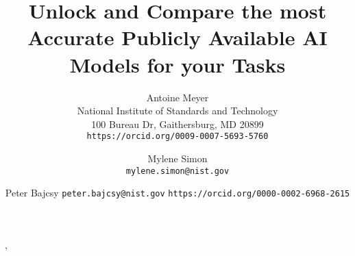 \documentclass[10pt,twocolumn,letterpaper]{article}
\title{Unlock and Compare the most Accurate Publicly Available AI Models for your Tasks}
\author{Antoine Meyer\\
National Institute of Standards and Technology\\
100 Bureau Dr, Gaithersburg, MD 20899\\
{\tt\small https://orcid.org/0009-0007-5693-5760}
\and
Mylene Simon\\
{\tt\small mylene.simon@nist.gov}
\and
Peter Bajcsy
{\tt\small peter.bajcsy@nist.gov}
{\tt\small https://orcid.org/0000-0002-6968-2615}
}
\begin{document}
\maketitle

\cite{Authors14}, \cite{Authors14b}









{
    \small
    
    
}

% 
\end{document}
